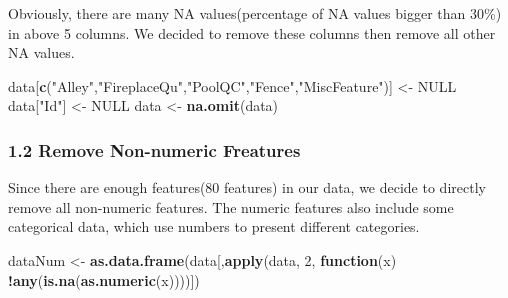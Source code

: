\documentclass[]{article}
\newenvironment{Shaded}{\begin{snugshade}}{\end{snugshade}}
\newcommand{\KeywordTok}[1]{\textcolor[rgb]{0.13,0.29,0.53}{\textbf{#1}}}
\newcommand{\DecValTok}[1]{\textcolor[rgb]{0.00,0.00,0.81}{#1}}
\newcommand{\StringTok}[1]{\textcolor[rgb]{0.31,0.60,0.02}{#1}}
\newcommand{\OtherTok}[1]{\textcolor[rgb]{0.56,0.35,0.01}{#1}}
\newcommand{\ControlFlowTok}[1]{\textcolor[rgb]{0.13,0.29,0.53}{\textbf{#1}}}
\newcommand{\OperatorTok}[1]{\textcolor[rgb]{0.81,0.36,0.00}{\textbf{#1}}}
\newcommand{\NormalTok}[1]{#1}
\begin{document}
Obviously, there are many NA values(percentage of NA values bigger than
30\%) in above 5 columns. We decided to remove these columns then remove
all other NA values.

\begin{Shaded}
\begin{Highlighting}[]
\NormalTok{data[}\KeywordTok{c}\NormalTok{(}\StringTok{"Alley"}\NormalTok{,}\StringTok{"FireplaceQu"}\NormalTok{,}\StringTok{"PoolQC"}\NormalTok{,}\StringTok{"Fence"}\NormalTok{,}\StringTok{"MiscFeature"}\NormalTok{)] <-}\StringTok{ }\OtherTok{NULL}
\NormalTok{data[}\StringTok{"Id"}\NormalTok{] <-}\StringTok{ }\OtherTok{NULL}
\NormalTok{data <-}\StringTok{ }\KeywordTok{na.omit}\NormalTok{(data)}
\end{Highlighting}
\end{Shaded}

\subsubsection{1.2 Remove Non-numeric
Freatures}\label{remove-non-numeric-freatures}

Since there are enough features(80 features) in our data, we decide to
directly remove all non-numeric features. The numeric features also
include some categorical data, which use numbers to present different
categories.

\begin{Shaded}
\begin{Highlighting}[]
\NormalTok{dataNum <-}\StringTok{ }\KeywordTok{as.data.frame}\NormalTok{(data[,}\KeywordTok{apply}\NormalTok{(data, }\DecValTok{2}\NormalTok{, }\ControlFlowTok{function}\NormalTok{(x) }\OperatorTok{!}\KeywordTok{any}\NormalTok{(}\KeywordTok{is.na}\NormalTok{(}\KeywordTok{as.numeric}\NormalTok{(x))))])}
\end{Highlighting}
\end{Shaded}
\end{document}
